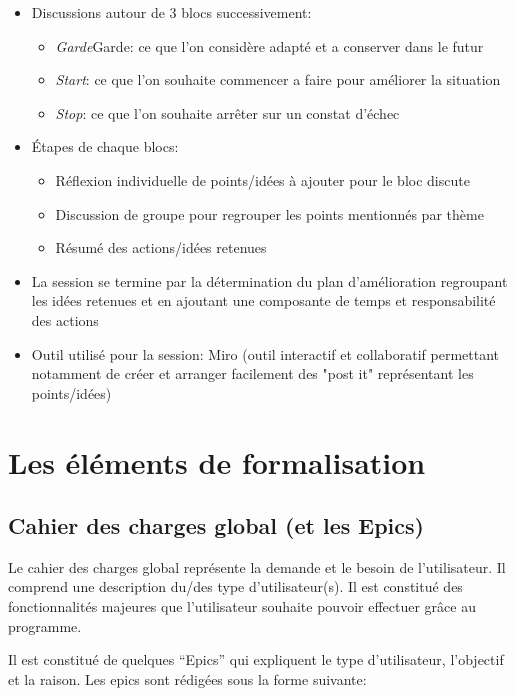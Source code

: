 \begin{itemize}
      \item Discussions autour de 3 blocs successivement:
      \begin{itemize}
            \item \emph{Garde}Garde: ce que l’on considère adapté et a conserver dans le futur
            \item \emph{Start}: ce que l’on souhaite commencer a faire pour améliorer la situation
            \item \emph{Stop}: ce que l’on souhaite arrêter sur un constat d'échec
      \end{itemize}
      \item Étapes de chaque blocs:
      \begin{itemize}
            \item Réflexion individuelle de points/idées à ajouter pour le bloc discute
            \item Discussion de groupe pour regrouper les points mentionnés par thème
            \item Résumé des actions/idées retenues
      \end{itemize}
      \item La session se termine par la détermination du plan d'amélioration regroupant les 
      idées retenues et en ajoutant une composante de temps et responsabilité des actions
      \item Outil utilisé pour la session: Miro (outil interactif et collaboratif permettant 
      notamment de créer et arranger facilement des "post it" représentant les points/idées)
\end{itemize}

\section{Les éléments de formalisation}

\subsection{Cahier des charges global (et les Epics)}
Le cahier des charges global représente la demande et le besoin de l’utilisateur. 
Il comprend une description du/des type d’utilisateur(s). Il est constitué des fonctionnalités majeures 
que l’utilisateur souhaite pouvoir effectuer grâce au programme. 

Il est constitué de quelques “Epics” qui expliquent le type d’utilisateur, l’objectif et la raison. 
Les epics sont rédigées sous la forme suivante:

